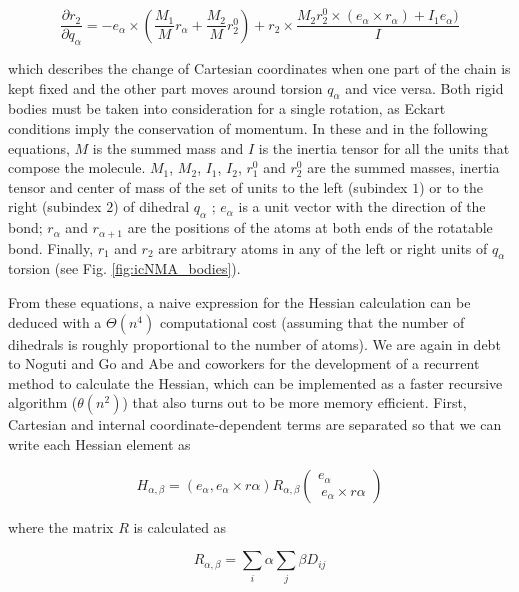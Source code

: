 \begin{equation}
\frac{\partial r_2}{\partial q_\alpha} = - e_\alpha \times \left( \frac{M_1}{M} r_\alpha + \frac{M_2}{M} r_2^0 \right) + r_2 \times \frac{M_2 r_2^0 \times (e_\alpha \times r_\alpha) + I_1 e_\alpha)}{I}
\end{equation}

which describes the change of Cartesian coordinates when one part of the chain is kept fixed and the other part moves around torsion $q_\alpha$ and vice versa. Both rigid bodies must be taken into consideration for a single rotation, as Eckart conditions imply the conservation of momentum. In these and in the following equations, $M$ is the summed mass and $I$ is the inertia tensor for all the units that compose the molecule. $M_1$, $M_2$, $I_1$, $I_2$, $r^0_1$ and $r^0_2$ are the summed masses, inertia tensor and center of mass of the set of units to the left (subindex $1$) or to the right (subindex $2$) of dihedral $q_\alpha$ ; $e_\alpha$ is a unit vector with the direction of the bond;  $r_\alpha$ and $r_{\alpha+1}$ are the positions of the atoms at both ends of the rotatable bond. Finally, $r_1$ and $r_2$ are arbitrary atoms in any of the left or right units of $q_\alpha$ torsion (see Fig. \ref{fig:icNMA_bodies}).

From these equations, a naive expression for the Hessian calculation can be deduced with a $\Theta (n^4)$ computational cost (assuming that the number of dihedrals is roughly proportional to the number of atoms). We are again in debt to Noguti and Go \cite{noguti_method_1983} and Abe and coworkers \cite{abe_rapid_1984} for the development of a recurrent method to calculate the Hessian, which can be implemented as a faster recursive algorithm ($\theta(n^2)$) that also turns out to be more memory efficient. First, Cartesian and internal coordinate-dependent terms are separated so that we can write each Hessian element as

\begin{equation}
H_{\alpha,\beta} = \left( e_\alpha, e_\alpha \times r\alpha \right) R_{\alpha,\beta} \left( \begin{array}{cc} e_\alpha \\\ e_\alpha \times r\alpha \end{array} \right)
\end{equation}

where the matrix $R$ is calculated as 

\begin{equation}
R_{\alpha,\beta} = \sum_i {\scriptscriptstyle \alpha} \sum_j {\scriptscriptstyle \beta} D_{ij}
\end{equation}

